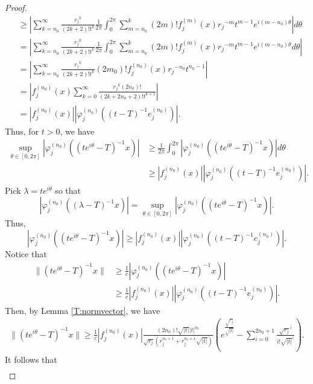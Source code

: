 \documentclass[10pt,a4paper]{amsart}
\begin{document}
\begin{proof}
\begin{align*}
&\geq
\left|\sum\limits_{k=n_0}^{\infty}\frac{{r_j}^k}{(2k+2)!t^{k}}\frac{1}{2\pi}\int_{0}^{2\pi}\sum\limits_{m=n_0}^{k}(2m)!f_j^{(m)}(x){r_j}^{-m}t^{m-1}e^{i(m-n_0)\theta}\right|d\theta\\
&=
\left|\sum\limits_{k=n_0}^{\infty}\frac{{r_j}^k}{(2k+2)!t^{k}}\frac{1}{2\pi}\int_{0}^{2\pi}\sum\limits_{m=n_0}^{k}(2m)!f_j^{(m)}(x){r_j}^{-m}t^{m-1}e^{i(m-n_0)\theta}d\theta\right|\\
&=
\left|\sum\limits_{k=n_0}^{\infty}\frac{{r_j}^k}{(2k+2)!t^{k}}(2m_0)!f_j^{(n_0)}(x){r_j}^{-n_0}t^{n_0-1}\right|\\
&=\left|f_j^{(n_0)}(x)\sum\limits_{k=0}^{\infty}\frac{{r_j}^k(2n_0)!}{(2k+2n_0+2)!t^{k+1}}\right|\\
&=
\left|f_j^{(n_0)}(x)\right|\left|\varphi_j^{(n_0)}\left((t-T)^{-1}e_j^{(n_0)}\right)\right|.
\end{align*}
Thus, for $t>0$, we have
\begin{align*}
\sup_{\theta\in[0,2\pi]}\left|\varphi_{j}^{(n_0)}\left((te^{i\theta}-T)^{-1}x\right)\right|
&\geq{\frac{1}{2\pi}\int_{0}^{2\pi}\left|\varphi_{j}^{(n_0)}\left((te^{i\theta}-T)^{-1}x\right)\right| d\theta}\\
&\geq \left|f_j^{(n_0)}(x)\right|\left|\varphi_j^{(n_0)}\left((t-T)^{-1}e_j^{(n_0)}\right)\right|.
\end{align*}
Pick $\lambda=te^{i\theta}$ so that
$$\left|\varphi_{j}^{(n_0)}\left((\lambda-T)^{-1}x\right)\right|=\sup_{\theta\in[0,2\pi]}\left|\varphi_{j}^{(n_0)}\left((te^{i\theta}-T)^{-1}x\right)\right|.$$
Thus,
$$\left|\varphi_{j}^{(n_0)}\left((te^{i\theta}-T)^{-1}x\right)\right|\geq \left|f_j^{(n_0)}(x)\right|\left|\varphi_j^{(n_0)}\left((t-T)^{-1}e_j^{(n_0)}\right)\right|.$$
Notice that
\begin{align*}
\|(te^{i\theta}-T)^{-1}x\|
&\geq \frac{1}{c}\left|\varphi_{j}^{(n_0)}\left((te^{i\theta}-T)^{-1}x\right)\right|\\
&\geq \frac{1}{c}\left|f_j^{(n_0)}(x)\right|\left|\varphi_j^{(n_0)}\left((t-T)^{-1}e_j^{(n_0)}\right)\right|.
\end{align*}
Then, by Lemma \ref{T:normvector}, we have
\begin{align*}\label{F:re}
\|(te^{i\theta}-T)^{-1}x\|
\geq
\frac{1}{c}\left|f_j^{(n_0)}(x)\right|\frac{(2n_0)!\sqrt{|t|}|t|^{n_0}}{\sqrt{r_j}(r_j^{n_0+1}+r_j^{n_0+1}\sqrt{|t|})}
\left(e^{\frac{\sqrt{r_j}}{\sqrt{|t|}}}-\sum_{i=0}^{2n_0+1}\frac{\sqrt{r_j}^i}{i!\sqrt{|t|}^{i}}\right).
\end{align*}
It follows that
\begin{align*}

\end{align*}
\end{proof}
\end{document}
